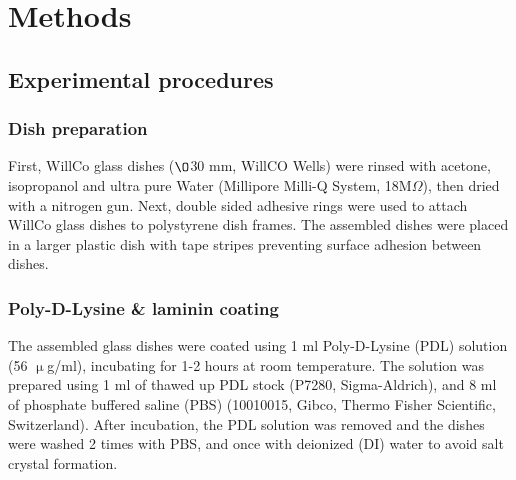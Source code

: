 \section{Methods}

\subsection{Experimental procedures}

\subsubsection{Dish preparation}
First, WillCo glass dishes ($\O$30 mm, WillCO Wells) were rinsed with acetone,
isopropanol and ultra pure Water (Millipore Milli-Q System, 18M$\Omega$), then
dried with a nitrogen gun. Next, double sided adhesive rings were used to
attach WillCo glass dishes to polystyrene dish frames. The assembled dishes were
placed in a larger plastic dish with tape stripes preventing surface adhesion
between dishes.


\subsubsection{Poly-D-Lysine \& laminin coating}
The assembled glass dishes were coated using 1 ml Poly-D-Lysine (PDL) solution
(56 $\upmu$g/ml), incubating for 1-2 hours at room temperature. The solution was
prepared using 1 ml of thawed up PDL stock (P7280, Sigma-Aldrich), and 8 ml of
phosphate buffered saline (PBS) (10010015, Gibco, Thermo Fisher Scientific,
Switzerland). After incubation, the PDL solution was removed and the dishes were
washed 2 times with PBS, and once with deionized (DI) water  to avoid salt
crystal formation. \\

